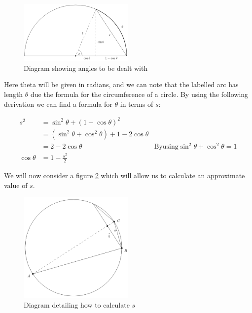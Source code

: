 \begin{figure}[!ht]
	\caption{Diagram showing angles to be dealt with}
	\label{FIG_"Geometric Trig 1"}
	\centering
	\includegraphics[width=0.5\textwidth]{"./Diagrams/Geometric Trig Diagram 1"}
\end{figure}

Here theta will be given in radians, and we can note that the labelled arc has length \(\theta\) due the formula for the circumference of a circle. By using the following derivation we can find a formula for \(\theta\) in terms of \(s\):

\begin{displaymath}
\begin{align*}
	s^2 &= \sin^2\theta + (1 - \cos\theta)^2\\
	    &= (\sin^2\theta + \cos^2\theta) + 1 - 2\cos\theta\\
		&= 2 - 2 \cos\theta 
			&\mathrm{By using } \sin^2\theta + \cos^2\theta = 1\\
	\cos\theta &= 1 - \frac{s^2}{2}
\end{align*}
\end{displaymath}

We will now consider a figure \ref{FIG_"Geometric Trig 2"} which will allow us to calculate an approximate value of \(s\).\\

\begin{figure}[!ht]
	\caption{Diagram detailing how to calculate \(s\)}
	\label{FIG_"Geometric Trig 2"}
	\centering
	\includegraphics[width=0.5\textwidth]{"./Diagrams/Geometric Trig Diagram 2"}
\end{figure}

